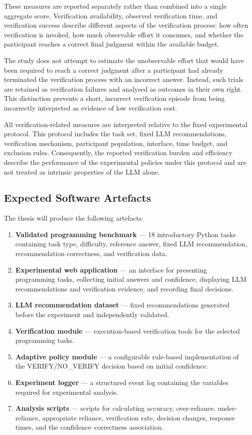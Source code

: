 \documentclass[oneside,final,14pt,a4paper]{extreport}
\theoremstyle{definition}
\theoremstyle{remark}
\begin{document}
These measures are reported separately rather than combined into a single
aggregate score. Verification availability, observed verification time, and
verification success describe different aspects of the verification process:
how often verification is invoked, how much observable effort it consumes, and
whether the participant reaches a correct final judgment within the available
budget.

The study does not attempt to estimate the unobservable effort that would have
been required to reach a correct judgment after a participant had already
terminated the verification process with an incorrect answer. Instead, such
trials are retained as verification failures and analysed as outcomes in their
own right. This distinction prevents a short, incorrect verification episode
from being incorrectly interpreted as evidence of low verification cost.

All verification-related measures are interpreted relative to the fixed
experimental protocol. This protocol includes the task set, fixed LLM
recommendations, verification mechanism, participant population, interface,
time budget, and exclusion rules. Consequently, the reported verification
burden and efficiency describe the performance of the experimental policies
under this protocol and are not treated as intrinsic properties of the LLM
alone.

\subsection{Expected Software Artefacts}
The thesis will produce the following artefacts:
\begin{enumerate}
    \item \textbf{Validated programming benchmark} --- 18 introductory Python
    tasks containing task type, difficulty, reference answer, fixed LLM
    recommendation, recommendation correctness, and verification data.
    \item \textbf{Experimental web application} --- an interface for presenting
    programming tasks, collecting initial answers and confidence, displaying
    LLM recommendations and verification evidence, and recording final
    decisions.
    \item \textbf{LLM recommendation dataset} --- fixed recommendations
    generated before the experiment and independently validated.
    \item \textbf{Verification module} --- execution-based verification tools
    for the selected programming tasks.
    \item \textbf{Adaptive policy module} --- a configurable rule-based
    implementation of the VERIFY/NO\_VERIFY decision based on initial
    confidence.
    \item \textbf{Experiment logger} --- a structured event log containing the
    variables required for experimental analysis.
    \item \textbf{Analysis scripts} --- scripts for calculating accuracy,
    over-reliance, under-reliance, appropriate reliance, verification rate,
    decision changes, response times, and the confidence--correctness
    association.
\end{enumerate}
\end{document}
